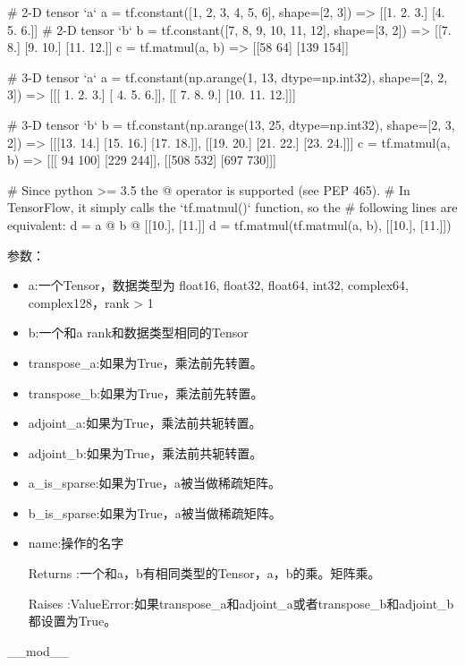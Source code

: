 \begin{python}
# 2-D tensor `a`
a = tf.constant([1, 2, 3, 4, 5, 6], shape=[2, 3]) => [[1. 2. 3.]
                                                      [4. 5. 6.]]
# 2-D tensor `b`
b = tf.constant([7, 8, 9, 10, 11, 12], shape=[3, 2]) => [[7. 8.]
                                                         [9. 10.]
                                                         [11. 12.]]
c = tf.matmul(a, b) => [[58 64]
                        [139 154]]

# 3-D tensor `a`
a = tf.constant(np.arange(1, 13, dtype=np.int32),
                shape=[2, 2, 3])                  => [[[ 1.  2.  3.]
                                                       [ 4.  5.  6.]],
                                                      [[ 7.  8.  9.]
                                                       [10. 11. 12.]]]

# 3-D tensor `b`
b = tf.constant(np.arange(13, 25, dtype=np.int32),
                shape=[2, 3, 2])                   => [[[13. 14.]
                                                        [15. 16.]
                                                        [17. 18.]],
                                                       [[19. 20.]
                                                        [21. 22.]
                                                        [23. 24.]]]
c = tf.matmul(a, b) => [[[ 94 100]
                         [229 244]],
                        [[508 532]
                         [697 730]]]

# Since python >= 3.5 the @ operator is supported (see PEP 465).
# In TensorFlow, it simply calls the `tf.matmul()` function, so the
# following lines are equivalent:
d = a @ b @ [[10.], [11.]]
d = tf.matmul(tf.matmul(a, b), [[10.], [11.]])
\end{python}
参数：
\begin{itemize}
	\item a:一个Tensor，数据类型为 float16, float32, float64, int32, complex64, complex128，rank > 1
	\item b:一个和a rank和数据类型相同的Tensor
	\item transpose\_a:如果为True，乘法前先转置。
	\item transpose\_b:如果为True，乘法前先转置。
	\item adjoint\_a:如果为True，乘法前共轭转置。
	\item adjoint\_b:如果为True，乘法前共轭转置。
	\item a\_is\_sparse:如果为True，a被当做稀疏矩阵。
	\item b\_is\_sparse:如果为True，a被当做稀疏矩阵。
	\item name:操作的名字
	\item[Returns]:一个和a，b有相同类型的Tensor，a，b的乘。矩阵乘。
	\item[Raises]:ValueError:如果transpose\_a和adjoint\_a或者transpose\_b和adjoint\_b都设置为True。
	\end{itemize}
\_\_mod\_\_\newline

